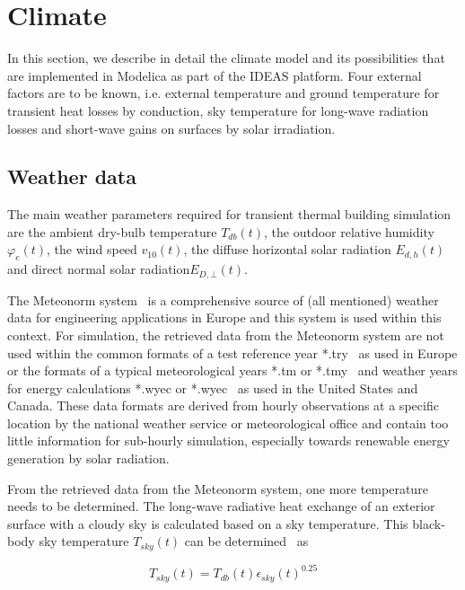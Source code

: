 \documentclass{book}
\begin{document}
\chapter{Climate}

In this section, we describe in detail the climate model and its possibilities that are implemented in Modelica as part of the IDEAS platform. Four external factors are to be known, i.e. external temperature and ground temperature for transient heat losses by conduction, sky temperature for long-wave radiation losses and short-wave gains on surfaces by solar irradiation.

\section{Weather data}
\label{chap:climwea}

The main weather parameters required for transient thermal building simulation are the ambient dry-bulb temperature $T_{db}(t)$, the outdoor relative humidity $\varphi_{e}(t)$, the wind speed $v_{10}(t)$, the diffuse horizontal solar radiation $E_{d,h}(t)$ and direct normal solar radiation$E_{D,\bot}(t)$. 

The Meteonorm system~\cite{Meteotest2008} is a comprehensive source of (all mentioned) weather data for engineering applications in Europe and this system is used within this context. For simulation, the retrieved data from the Meteonorm system are not used within the common formats of a test reference year *.try~\cite{NCDC1981,EC1985} as used in Europe or the formats of a typical meteorological years *.tm or *.tmy~\cite{NCDC1976b,NREC1995} and weather years for energy calculations *.wyec or *.wyec~\cite{ASHRAE1985} as used in the United States and Canada. These data formats are derived from hourly observations at a specific location by the national weather service or meteorological office and contain too little information for sub-hourly simulation, especially towards renewable energy generation by solar radiation.

From the retrieved data from the Meteonorm system, one more temperature needs to be determined. The long-wave radiative heat exchange of an exterior surface with a cloudy sky is calculated based on a sky temperature. This black-body sky temperature $T_{sky}(t)$ can be determined~\cite{Walton1983,Martin1984} as

\begin{equation}
T_{sky}(t)=T_{db}(t)\epsilon_{sky}(t)^{0.25}
\end{equation}
\end{document}
